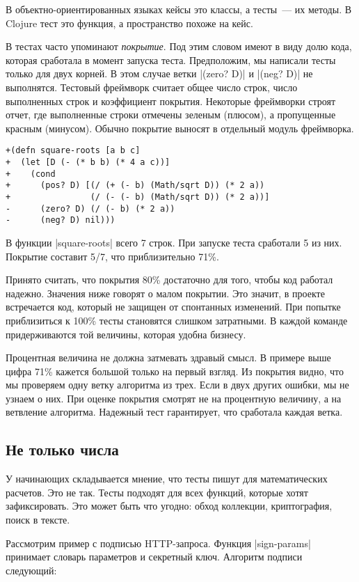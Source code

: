 В объектно-ориентированных языках кейсы это классы, а тесты~--- их методы. В
Clojure тест это функция, а пространство похоже на кейс.

В тестах часто упоминают \emph{покрытие}. Под этим словом имеют в виду долю
кода, которая сработала в момент запуска теста. Предположим, мы написали тесты
только для двух корней. В этом случае ветки \spverb|(zero? D)| и \spverb|(neg? D)|
не выполнятся. Тестовый фреймворк считает общее число строк, число выполненных строк
и коэффициент покрытия. Некоторые фреймворки строят отчет, где выполненные строки
отмечены зеленым (плюсом), а пропущенные красным (минусом). Обычно покрытие выносят
в отдельный модуль фреймворка.

\begin{verbatim}
+(defn square-roots [a b c]
+  (let [D (- (* b b) (* 4 a c))]
+    (cond
+      (pos? D) [(/ (+ (- b) (Math/sqrt D)) (* 2 a))
+                (/ (- (- b) (Math/sqrt D)) (* 2 a))]
-      (zero? D) (/ (- b) (* 2 a))
-      (neg? D) nil)))
\end{verbatim}

В функции \spverb|square-roots| всего 7 строк. При запуске теста сработали 5 из
них. Покрытие составит 5/7, что приблизительно 71\%.

Принято считать, что покрытия 80\% достаточно для того, чтобы код работал
надежно. Значения ниже говорят о малом покрытии. Это значит, в проекте
встречается код, который не защищен от спонтанных изменений. При попытке
приблизиться к 100\% тесты становятся слишком затратными. В каждой команде
придерживаются той величины, которая удобна бизнесу.

Процентная величина не должна затмевать здравый смысл. В примере выше цифра 71\%
кажется большой только на первый взгляд. Из покрытия видно, что мы проверяем
одну ветку алгоритма из трех. Если в двух других ошибки, мы не узнаем о них. При
оценке покрытия смотрят не на процентную величину, а на ветвление
алгоритма. Надежный тест гарантирует, что сработала каждая ветка.

\subsection{Не только числа}

У начинающих складывается мнение, что тесты пишут для математических
расчетов. Это не так. Тесты подходят для всех функций, которые хотят
зафиксировать. Это может быть что угодно: обход коллекции, криптография, поиск в
тексте.

Рассмотрим пример с подписью HTTP-запроса. Функция \spverb|sign-params|
принимает словарь параметров и секретный ключ. Алгоритм подписи следующий:

